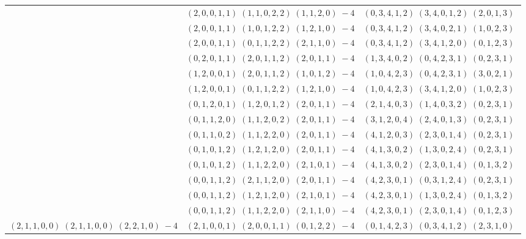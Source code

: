 \documentclass[11pt]{article}
\begin{document}
\begin{longtable}[l]{|c|c|c|}
 \cline{2-3} 
 & $(2 ,0 ,0 ,1 ,1) \;(1 ,1 ,0 ,2 ,2) \;(1 ,1 ,2 ,0) \;-4$ & $(0 ,3 ,4 ,1 ,2) \;(3 ,4 ,0 ,1 ,2) \;(2 ,0 ,1 ,3) \;$\\ 
 \cline{2-3} 
 & $(2 ,0 ,0 ,1 ,1) \;(1 ,0 ,1 ,2 ,2) \;(1 ,2 ,1 ,0) \;-4$ & $(0 ,3 ,4 ,1 ,2) \;(3 ,4 ,0 ,2 ,1) \;(1 ,0 ,2 ,3) \;$\\ 
 \cline{2-3} 
 & $(2 ,0 ,0 ,1 ,1) \;(0 ,1 ,1 ,2 ,2) \;(2 ,1 ,1 ,0) \;-4$ & $(0 ,3 ,4 ,1 ,2) \;(3 ,4 ,1 ,2 ,0) \;(0 ,1 ,2 ,3) \;$\\ 
 \cline{2-3} 
 & $(0 ,2 ,0 ,1 ,1) \;(2 ,0 ,1 ,1 ,2) \;(2 ,0 ,1 ,1) \;-4$ & $(1 ,3 ,4 ,0 ,2) \;(0 ,4 ,2 ,3 ,1) \;(0 ,2 ,3 ,1) \;$\\ 
 \cline{2-3} 
 & $(1 ,2 ,0 ,0 ,1) \;(2 ,0 ,1 ,1 ,2) \;(1 ,0 ,1 ,2) \;-4$ & $(1 ,0 ,4 ,2 ,3) \;(0 ,4 ,2 ,3 ,1) \;(3 ,0 ,2 ,1) \;$\\ 
 \cline{2-3} 
 & $(1 ,2 ,0 ,0 ,1) \;(0 ,1 ,1 ,2 ,2) \;(1 ,2 ,1 ,0) \;-4$ & $(1 ,0 ,4 ,2 ,3) \;(3 ,4 ,1 ,2 ,0) \;(1 ,0 ,2 ,3) \;$\\ 
 \cline{2-3} 
 & $(0 ,1 ,2 ,0 ,1) \;(1 ,2 ,0 ,1 ,2) \;(2 ,0 ,1 ,1) \;-4$ & $(2 ,1 ,4 ,0 ,3) \;(1 ,4 ,0 ,3 ,2) \;(0 ,2 ,3 ,1) \;$\\ 
 \cline{2-3} 
 & $(0 ,1 ,1 ,2 ,0) \;(1 ,1 ,2 ,0 ,2) \;(2 ,0 ,1 ,1) \;-4$ & $(3 ,1 ,2 ,0 ,4) \;(2 ,4 ,0 ,1 ,3) \;(0 ,2 ,3 ,1) \;$\\ 
 \cline{2-3} 
 & $(0 ,1 ,1 ,0 ,2) \;(1 ,1 ,2 ,2 ,0) \;(2 ,0 ,1 ,1) \;-4$ & $(4 ,1 ,2 ,0 ,3) \;(2 ,3 ,0 ,1 ,4) \;(0 ,2 ,3 ,1) \;$\\ 
 \cline{2-3} 
 & $(0 ,1 ,0 ,1 ,2) \;(1 ,2 ,1 ,2 ,0) \;(2 ,0 ,1 ,1) \;-4$ & $(4 ,1 ,3 ,0 ,2) \;(1 ,3 ,0 ,2 ,4) \;(0 ,2 ,3 ,1) \;$\\ 
 \cline{2-3} 
 & $(0 ,1 ,0 ,1 ,2) \;(1 ,1 ,2 ,2 ,0) \;(2 ,1 ,0 ,1) \;-4$ & $(4 ,1 ,3 ,0 ,2) \;(2 ,3 ,0 ,1 ,4) \;(0 ,1 ,3 ,2) \;$\\ 
 \cline{2-3} 
 & $(0 ,0 ,1 ,1 ,2) \;(2 ,1 ,1 ,2 ,0) \;(2 ,0 ,1 ,1) \;-4$ & $(4 ,2 ,3 ,0 ,1) \;(0 ,3 ,1 ,2 ,4) \;(0 ,2 ,3 ,1) \;$\\ 
 \cline{2-3} 
 & $(0 ,0 ,1 ,1 ,2) \;(1 ,2 ,1 ,2 ,0) \;(2 ,1 ,0 ,1) \;-4$ & $(4 ,2 ,3 ,0 ,1) \;(1 ,3 ,0 ,2 ,4) \;(0 ,1 ,3 ,2) \;$\\ 
 \cline{2-3} 
 & $(0 ,0 ,1 ,1 ,2) \;(1 ,1 ,2 ,2 ,0) \;(2 ,1 ,1 ,0) \;-4$ & $(4 ,2 ,3 ,0 ,1) \;(2 ,3 ,0 ,1 ,4) \;(0 ,1 ,2 ,3) \;$\\ \hline\multirow[t]{22}{*}{ $(2 ,1 ,1 ,0 ,0) \;(2 ,1 ,1 ,0 ,0) \;(2 ,2 ,1 ,0) \;-4$ }  & $(2 ,1 ,0 ,0 ,1) \;(2 ,0 ,0 ,1 ,1) \;(0 ,1 ,2 ,2) \;-4$ & $(0 ,1 ,4 ,2 ,3) \;(0 ,3 ,4 ,1 ,2) \;(2 ,3 ,1 ,0) \;$\\ 

\end{longtable}
\end{document}
